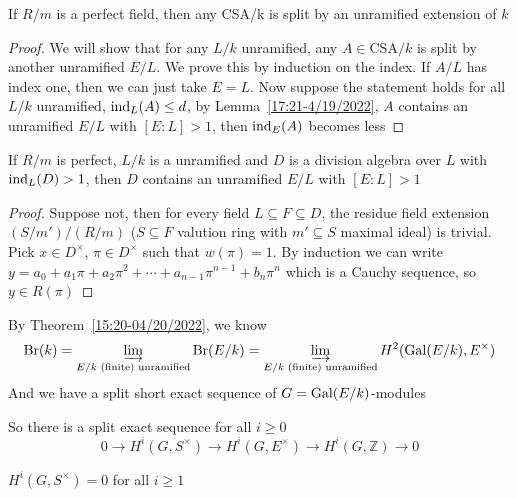 \documentclass[a4paper,10pt]{article}
\begin{document}
\begin{theorem}\label{15:20-04/20/2022}
If $R/m$ is a perfect field, then any CSA/k is split by an unramified extension of $k$
\end{theorem}

\begin{proof}
We will show that for any $L/k$ unramified, any $A\in\text{CSA}/k$ is split by another unramified $E/L$. We prove this by induction on the index. If $A/L$ has index one, then we can just take $E=L$. Now suppose the statement holds for all $L/k$ unramified, $\operatorname{ind}_L(A)\leq d$, by Lemma~\ref{17:21-4/19/2022}, $A$ contains an unramified $E/L$ with $[E:L]>1$, then $\operatorname{ind}_E(A)$ becomes less
\end{proof}

\begin{lemma}\label{17:21-4/19/2022}
If $R/m$ is perfect, $L/k$ is a unramified and $D$ is a division algebra over $L$ with $\operatorname{ind}_L(D)>1$, then $D$ contains an unramified $E/L$ with $[E:L]>1$
\end{lemma}

\begin{proof}
Suppose not, then for every field $L\subseteq F\subseteq D$, the residue field extension $(S/m')/(R/m)$ ($S\subseteq F$ valution ring with $m'\subseteq S$ maximal ideal) is trivial. Pick $x\in D^\times$, $\pi\in D^\times$ such that $w(\pi)=1$. By induction we can write $y=a_0+a_1\pi+a_2\pi^2+\cdots+a_{n-1}\pi^{n-1}+b_n\pi^n$ which is a Cauchy sequence, so $y\in R(\pi)$
\end{proof}

By Theorem~\ref{15:20-04/20/2022}, we know
\[
\operatorname{Br}(k)=\varinjlim_{E/k\text{ (finite) unramified}}\operatorname{Br}(E/k)=\varinjlim_{E/k\text{ (finite) unramified}}H^2(\operatorname{Gal}(E/k),E^\times)
\]
And we have a split short exact sequence of $G=\operatorname{Gal}(E/k)$-modules
\begin{center}
\end{center}
So there is a split exact sequence for all $i\geq0$
\[
0\to H^i(G,S^\times)\to H^i(G,E^\times)\to H^i(G,\mathbb Z)\to0
\]

\begin{proposition}
$H^i(G,S^\times)=0$ for all $i\geq1$
\end{proposition}
\end{document}
